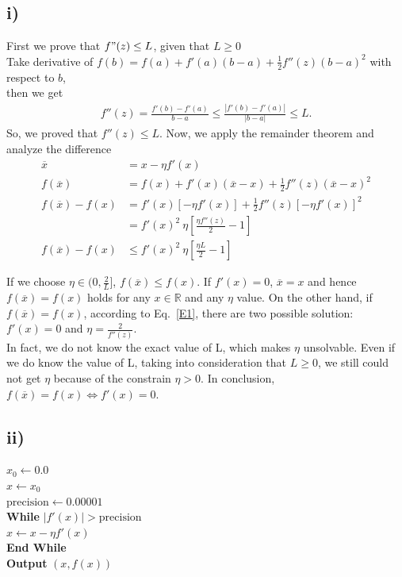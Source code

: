\documentclass[twoside,11pt]{homework}
\begin{document}
\subsection*{i)}
First we prove that $f"(z)\leq L$, given that $L \geq 0$ \\
Take derivative of $f(b) = f(a) + f'(a)(b-a) + \frac{1}{2} f''(z) (b-a)^2$ with respect to $b$,\\
then we get %
\begin{equation}
\begin{split}
f''(z) = \frac{f'(b) - f'(a)}{b-a} \le \frac{|f'(b) - f'(a)|}{|b-a|} \le L.
\end{split}
\label{E1}
\end{equation}
So, we proved that $ f''(z) \leq L.$
Now, we apply the remainder theorem and analyze the difference %
%
\begin{equation}
\begin{split}
  \overline{x} &= x - \eta f'(x) \\
  f(\overline{x}) &= f(x)+ f'(x)(\overline{x}-x)+\frac{1}{2}f''(z)(\overline{x}-x)^2 \\
  f(\overline{x})-f(x) &= f'(x) [-\eta f'(x)] + \frac{1}{2}f''(z)[-\eta f'(x)]^2 \\
  &= f'(x)^2\ \eta [\frac{\eta f''(z)}{2} - 1] \\
  f(\overline{x})-f(x)  &\leq f'(x)^2\ \eta [\frac{\eta L}{2} - 1]
\end{split}
\label{E1}
\end{equation}
%

If we choose $\eta \in (0, \frac{2}{L}]$,  $f(\overline{x}) \le f(x)$. If $f'(x) = 0$, $\overline{x} = x$ and hence $f(\overline{x}) = f(x)$ holds for any $x \in \mathbb{R}$ and any $\eta$ value.
On the other hand, if $f(\overline{x}) = f(x)$, according to Eq.~\ref{E1}, there are two possible solution:
$f'(x) = 0$ and $\eta = \frac{2}{f''(z)}$. \\

In fact, we do not know the exact value of L, which makes $\eta$ unsolvable. Even if we do know the value of L, taking into consideration that $L \geq 0$, we still could not get $\eta$ because of the constrain $\eta > 0$.
In conclusion, $f(\overline{x}) = f(x) \Longleftrightarrow f'(x) = 0$.

\color{black}
\subsection*{ii)}
$x_{0} \leftarrow 0.0$ \\
$x \leftarrow x_{0}$ \\
$\mathrm{precision} \leftarrow 0.00001$ \\
\textbf{While} $|f'(x)| > \mathrm{precision} $ \\
\hspace*{5mm} $x \leftarrow x-\eta f'(x)$\\
\textbf{End While} \\
\textbf{Output} $(x, f(x))$ 
\end{document}
